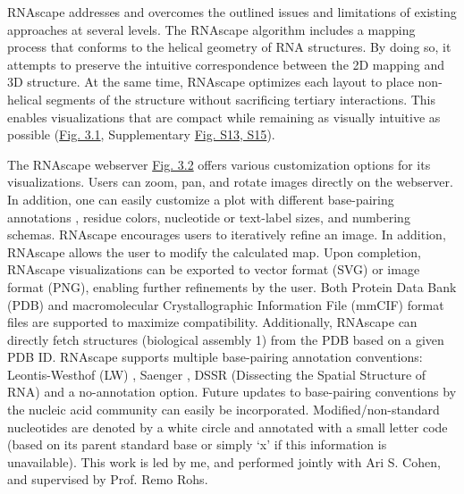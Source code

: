 \par
RNAscape addresses and overcomes the outlined issues and limitations of existing approaches at several levels. The RNAscape algorithm includes a mapping process that conforms to the helical geometry of RNA structures. By doing so, it attempts to preserve the intuitive correspondence between the 2D mapping and 3D structure. At the same time, RNAscape optimizes each layout to place non-helical segments of the structure without sacrificing tertiary interactions. This enables visualizations that are compact while remaining as visually intuitive as possible (\hyperref[fig:rnascape1]{Fig. 3.1}, Supplementary \hyperref[fig:rnascapeS1]{Fig. S13, S15}).
\par
The RNAscape webserver \hyperref[fig:rnascape2]{Fig. 3.2} offers various customization options for its visualizations. Users can zoom, pan, and rotate images directly on the webserver. In addition, one can easily customize a plot with different base-pairing annotations \citep{Yang2003, Saenger1984,lu2015dssr}, residue colors, nucleotide or text-label sizes, and numbering schemas. RNAscape encourages users to iteratively refine an image. In addition, RNAscape allows the user to modify the calculated map. Upon completion, RNAscape visualizations can be exported to vector format (SVG) or image format (PNG), enabling further refinements by the user. Both Protein Data Bank (PDB) and macromolecular Crystallographic Information File (mmCIF) format files are supported to maximize compatibility. Additionally, RNAscape can directly fetch structures (biological assembly 1) from the PDB \citep{berman2000protein,} based on a given PDB ID. RNAscape supports multiple base-pairing annotation conventions: Leontis-Westhof (LW) \citep{Yang2003}, Saenger \citep{Saenger1984}, DSSR (Dissecting the Spatial Structure of RNA) \citep{lu2015dssr} and a no-annotation option. Future updates to base-pairing conventions by the nucleic acid community can easily be incorporated. Modified/non-standard nucleotides are denoted by a white circle and annotated with a small letter code (based on its parent standard base or simply ‘x’ if this information is unavailable). This work is led by me, and performed jointly with Ari S. Cohen, and supervised by Prof. Remo Rohs.
